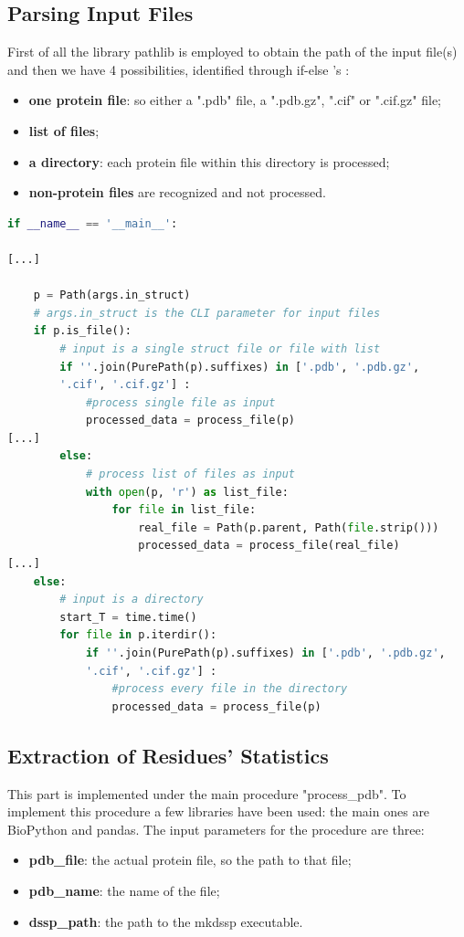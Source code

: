 \subsection{Parsing Input Files}
First of all the library pathlib is employed to obtain the path of the input file(s) and then we have 4 possibilities, identified through if-else 's :
\begin{itemize}
    \item \textbf{one protein file}: so either a ".pdb" file, a ".pdb.gz", ".cif" or ".cif.gz" file;
    \item \textbf{list of files};
    \item \textbf{a directory}: each protein file within this directory is processed;
    \item \textbf{non-protein files} are recognized and not processed.
\end{itemize}

\begin{lstlisting}[language=Python, caption=Input\ files\ parsing]
if __name__ == '__main__':
    
[...]
    
    p = Path(args.in_struct)
    # args.in_struct is the CLI parameter for input files
    if p.is_file():
        # input is a single struct file or file with list
        if ''.join(PurePath(p).suffixes) in ['.pdb', '.pdb.gz', 
        '.cif', '.cif.gz'] :
            #process single file as input
            processed_data = process_file(p)
[...]
        else:
            # process list of files as input 
            with open(p, 'r') as list_file:
                for file in list_file:
                    real_file = Path(p.parent, Path(file.strip()))
                    processed_data = process_file(real_file)
[...]
    else:
        # input is a directory
        start_T = time.time()
        for file in p.iterdir():
            if ''.join(PurePath(p).suffixes) in ['.pdb', '.pdb.gz',
            '.cif', '.cif.gz'] :
                #process every file in the directory
                processed_data = process_file(p)
\end{lstlisting}


\subsection{Extraction of Residues' Statistics}

This part is implemented under the main procedure "process\_pdb". To implement this procedure a few libraries have been used: the main ones are BioPython and pandas. The input parameters for the procedure are three:
\begin{itemize}
    \item \textbf{pdb\_file}: the actual protein file, so the path to that file;
    \item \textbf{pdb\_name}: the name of the file;
    \item \textbf{dssp\_path}: the path to the mkdssp executable.
\end{itemize}
